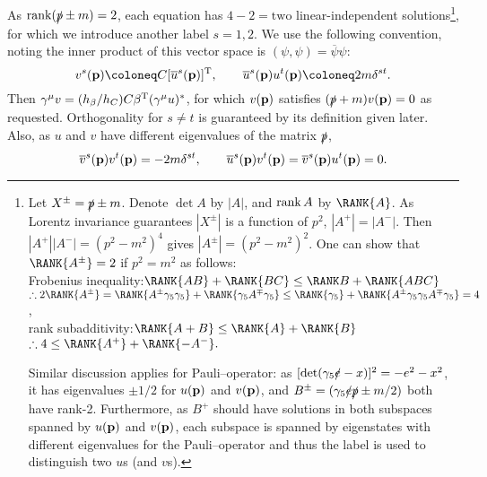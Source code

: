 \documentclass{CheatSheet}
\begin{document}
As $\operatorname{\mathrm{rank}}(\slashed p\pm m)=2$, each equation has $4-2 = \text{two}$ linear-independent solutions\footnote{%
  Let $X^\pm=\slashed{p}\pm m$. Denote $\det A$ by $|A|$, and $\operatorname{\mathrm{rank}} A$ by $\RANK{A}$.
  As Lorentz invariance guarantees $|X^\pm|$ is a function of $p^2$, $|A^+|=|A^-|$.
  Then $|A^+||A^-| = (p^2-m^2)^4$ gives $|A^\pm|=(p^2-m^2)^2$.
  One can show that $\RANK{A^\pm}=2$ if $p^2=m^2$ as follows:
\\%
Frobenius inequality:\qquad $\RANK{AB}+\RANK{BC}\le \RANK B + \RANK{ABC}$\qquad
$\therefore 2\RANK{A^\pm}=\RANK{A^\pm\gamma_5\gamma_5} + \RANK{\gamma_5A^\mp\gamma_5} \le \RANK{\gamma_5}+\RANK{A^\pm\gamma_5\gamma_5A^\mp\gamma_5}=4$,
\\%
rank subadditivity:\qquad$\RANK{A+B}\le\RANK{A}+\RANK{B}$\qquad
$\therefore4\le\RANK{A^+}+\RANK{-A^-}.$

Similar discussion applies for Pauli--\Lubanski operator: as $[\det(\gamma_5\slashed{e}-x)]^2=-e^2-x^2$, it has eigenvalues $\pm1/2$ for $u({\mathbf{p}})$ and $v({\mathbf{p}})$, and 
$B^\pm=(\gamma_5\slashed e\slashed p\pm m/2)$ both have rank-2.
Furthermore, \TOCHECK as $B^+$ should have solutions in both subspaces spanned by $u({\mathbf{p}})$ and $v({\mathbf{p}})$, each subspace is spanned by eigenstates with different eigenvalues for the Pauli--\Lubanski operator and thus the label is used to distinguish two $u$s (and $v$s).
}, for which we introduce another label $s=1,2$.
We use the following convention, noting the inner product of this vector space is $(\psi,\psi)=\overline\psi\psi$:
\begin{equation}
 v^s(\vc p)\coloneq C[\overline{u}^s(\vc p)]^\TT,\qquad
 \overline u^s(\vc p)u^t(\vc p)\coloneq 2m\delta^{st}.
\end{equation}
Then $\gamma^\mu v = (h_\beta/h_C)C\beta^{\mathrm{T}}(\gamma^\mu u)^*$, for which $v({\mathbf{p}})$ satisfies $(\slashed{p}+m)v({\mathbf{p}})=0$ as requested.
Orthogonality for $s\neq t$ is guaranteed by its definition given later.
Also, as $u$ and $v$ have different eigenvalues of the matrix $\slashed p$,
\begin{equation}
  \overline v^s({\mathbf{p}})v^t({\mathbf{p}})=-2m\delta^{st},\qquad
 \overline u^s({\mathbf{p}})v^t({\mathbf{p}})=\overline v^s({\mathbf{p}})u^t({\mathbf{p}})=0.
\end{equation}
\end{document}
